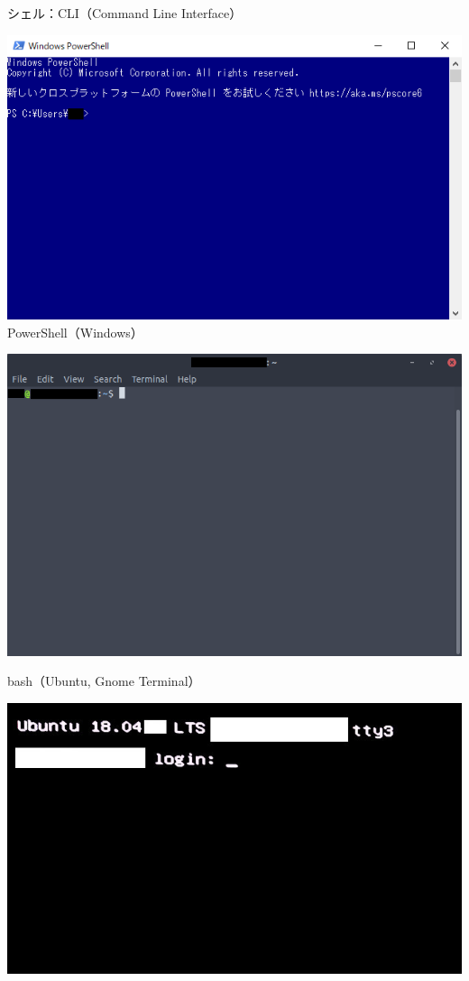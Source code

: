 \documentclass[12pt,aspectratio=169]{beamer}
\begin{document}
\begin{frame}{シェル：CLI（Command Line Interface）}
\begin{minipage}{0.3\textwidth}
    \includegraphics[width=1.2\linewidth,bb=0 0 620 388]{./images/powershell.png}
    PowerShell（Windows）
  \end{minipage}
  \hfill
  \begin{minipage}{0.3\textwidth}
    \includegraphics[width=\linewidth,bb=0 0 734 487]{./images/ubuntu-gnome.png}
    \begin{flushleft} \small bash（Ubuntu, Gnome Terminal） \end{flushleft}
    \includegraphics[width=\linewidth,bb=0 0 734 487]{./images/ubuntu-cli.jpg}

\end{minipage}
\end{frame}
\end{document}
